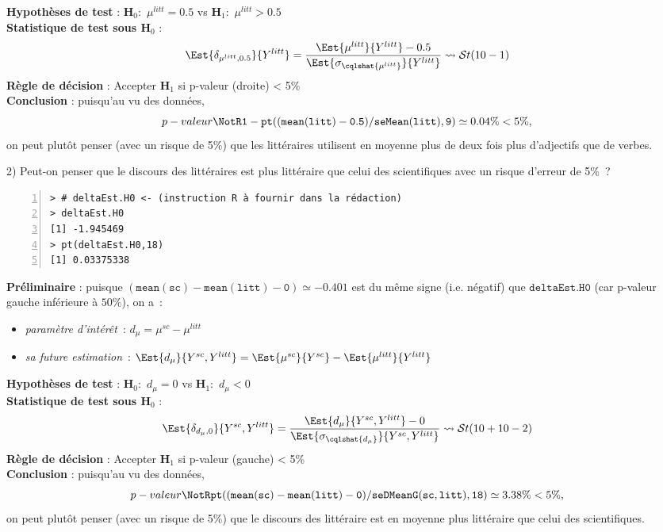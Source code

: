 \documentclass[10pt]{report}
\begin{document}
\begin{exercice}
\begin{Correction}
\noindent \textbf{Hypothèses de test} : $\mathbf{H}_0:$ $\mu^{litt}=0.5$ vs {\large $\mathbf{H}_1:$ $\mu^{litt}>0.5$}\\
\textbf{Statistique de test sous $\mathbf{H}_0$} :
  $$
  \Est{\delta_{\mu^{litt},0.5}}{Y^{litt}}= {\displaystyle \frac{\Est{\mu^{litt}}{Y^{litt}}-0.5}{
\Est{\sigma_{\cqlshat{\mu^{litt}}}}{Y^{litt}}
}} 
  \leadsto \mathcal{S}t(10-1)
  $$
\textbf{Règle de décision} : Accepter $\mathbf{H}_1$ si 
  p-valeur (droite) < 5\%\\
\noindent \textbf{Conclusion} :
puisqu'au vu des données, 
  \[
p-valeur\NotR\mathtt{1-pt((mean(litt)-0.5)/seMean(litt),9)} \simeq 0.04\% < 5\%,
\]
on peut plutôt penser (avec un risque de 5\%) que les littéraires utilisent en moyenne plus de deux fois plus d'adjectifs que de verbes.
\end{Correction}


2) Peut-on penser que le discours des littéraires est plus littéraire que celui des scientifiques avec un risque d'erreur de 5\%~?

\IndicR
\begin{Verbatim}[frame=leftline,fontfamily=tt,fontshape=n,numbers=left]
> # deltaEst.H0 <- (instruction R à fournir dans la rédaction)
> deltaEst.H0
[1] -1.945469
> pt(deltaEst.H0,18)
[1] 0.03375338
\end{Verbatim}

 

\begin{Correction}
\noindent \textbf{Préliminaire} : puisque $\mathtt{(mean(sc)-mean(litt)-0)}\simeq-0.401$ est du même signe (i.e. négatif) que $\mathtt{deltaEst.H0}$ (car p-valeur gauche inférieure à $50\%$), on a~: 
      \begin{itemize}
\item \textit{paramètre d'intérêt}~: $d_\mu=\mu^{sc}-\mu^{litt}$
\item \textit{sa future estimation}~: $\Est{d_\mu}{Y^{sc},Y^{litt}}=\Est{\mu^{sc}}{Y^{sc}}-\Est{\mu^{litt}}{Y^{litt}}$
\end{itemize}
\noindent \textbf{Hypothèses de test} : $\mathbf{H}_0:$ $d_\mu=0$ vs {\large $\mathbf{H}_1:$ $d_\mu<0$}\\
\textbf{Statistique de test sous $\mathbf{H}_0$} :
  $$
  \Est{\delta_{d_\mu,0}}{Y^{sc},Y^{litt}}= {\displaystyle \frac{\Est{d_\mu}{Y^{sc},Y^{litt}}-0}{
\Est{\sigma_{\cqlshat{d_\mu}}}{Y^{sc},Y^{litt}}
}} 
  \leadsto \mathcal{S}t(10+10-2) 
  $$
\textbf{Règle de décision} : Accepter $\mathbf{H}_1$ si 
  p-valeur (gauche) < 5\%\\
\noindent \textbf{Conclusion} :
puisqu'au vu des données, 
  \[
p-valeur\NotR\mathtt{pt((mean(sc)-mean(litt)-0)/seDMeanG(sc,litt),18)} \simeq 3.38\% < 5\%,
\]
on peut plutôt penser (avec un risque de 5\%) que le discours des littéraire est en moyenne plus littéraire que celui des scientifiques.
\end{Correction}




\end{exercice}
\end{document}
